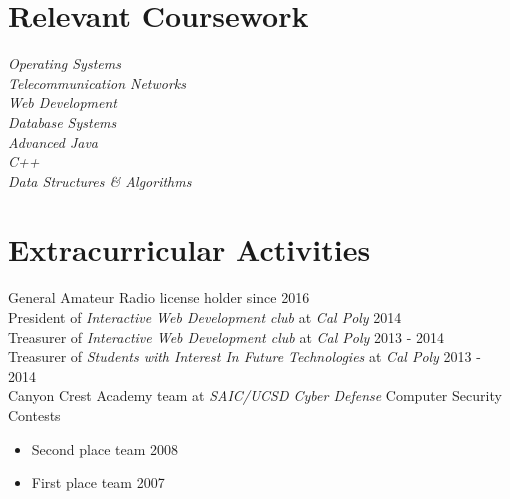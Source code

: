 \documentclass[line]{docs/resume/res}
\begin{document}
\begin{resume}
\section{Relevant Coursework}
  {\sl Operating Systems } \\
  {\sl Telecommunication Networks } \\
  {\sl Web Development } \\
  {\sl Database Systems } \\
  {\sl Advanced Java} \\
  {\sl C++} \\
  {\sl Data Structures \& Algorithms}

\section{Extracurricular Activities}
  General Amateur Radio license holder since \hfill 2016 \\
  President of {\it Interactive Web Development club} at {\it Cal Poly} \hfill 2014 \\
  Treasurer of {\it Interactive Web Development club} at {\it Cal Poly} \hfill 2013 - 2014 \\
  Treasurer of {\it Students with Interest In Future Technologies} at {\it Cal Poly} \hfill 2013 - 2014 \\
  Canyon Crest Academy team at {\it SAIC/UCSD Cyber Defense} Computer Security Contests
  \begin{itemize} \itemsep -2pt
    \item Second place team \hfill 2008
    \item First place team \hfill 2007
  \end{itemize}

\end{resume}
\end{document}
